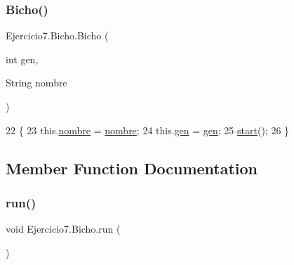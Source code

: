 \subsubsection{\texorpdfstring{Bicho()}{Bicho()}}
{\footnotesize\ttfamily Ejercicio7.\+Bicho.\+Bicho (\begin{DoxyParamCaption}\item[{int}]{gen,  }\item[{String}]{nombre }\end{DoxyParamCaption})\hspace{0.3cm}{\ttfamily [inline]}}


\begin{DoxyCode}
22                                          \{
23         this.\mbox{\hyperlink{class_ejercicio7_1_1_bicho_aa5bc3fb03f56e116638d14ceb590aecd}{nombre}} = \mbox{\hyperlink{class_ejercicio7_1_1_bicho_aa5bc3fb03f56e116638d14ceb590aecd}{nombre}};
24         this.\mbox{\hyperlink{class_ejercicio7_1_1_bicho_a0cd88157aea1b2436f8328ae67383447}{gen}} = \mbox{\hyperlink{class_ejercicio7_1_1_bicho_a0cd88157aea1b2436f8328ae67383447}{gen}};
25         \mbox{\hyperlink{namespaceejemplo_1_1clase_abcf43191f0ecf3b071ca2db7696ba821}{start}}();
26     \}
\end{DoxyCode}


\subsection{Member Function Documentation}
\mbox{\label{class_ejercicio7_1_1_bicho_aa1aefe543067b1a8ae1daf78c5ec24d2}} 
\subsubsection{\texorpdfstring{run()}{run()}}
{\footnotesize\ttfamily void Ejercicio7.\+Bicho.\+run (\begin{DoxyParamCaption}{ }\end{DoxyParamCaption})\hspace{0.3cm}{\ttfamily [inline]}}


